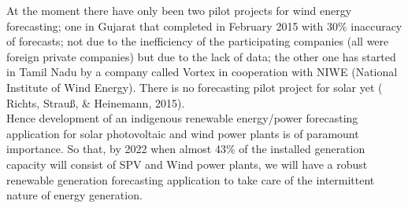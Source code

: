 At the moment there have only been two pilot projects for wind energy forecasting; one in Gujarat that completed in February 2015 with 30\% inaccuracy of forecasts; not due to the inefficiency of the participating companies (all were foreign private companies) but due to the lack of data; the other one has started in Tamil Nadu by a company called Vortex in cooperation with NIWE (National Institute of Wind Energy). There is no forecasting pilot project for solar yet ( Richts, Strauß, & Heinemann, 2015).\\

Hence development of an indigenous renewable energy/power forecasting application for solar photovoltaic and wind power plants is of paramount importance. So that, by 2022 when almost 43\% of the installed generation capacity will consist of SPV and Wind power plants, we will have a robust renewable generation forecasting application to take care of the intermittent nature of energy generation.




